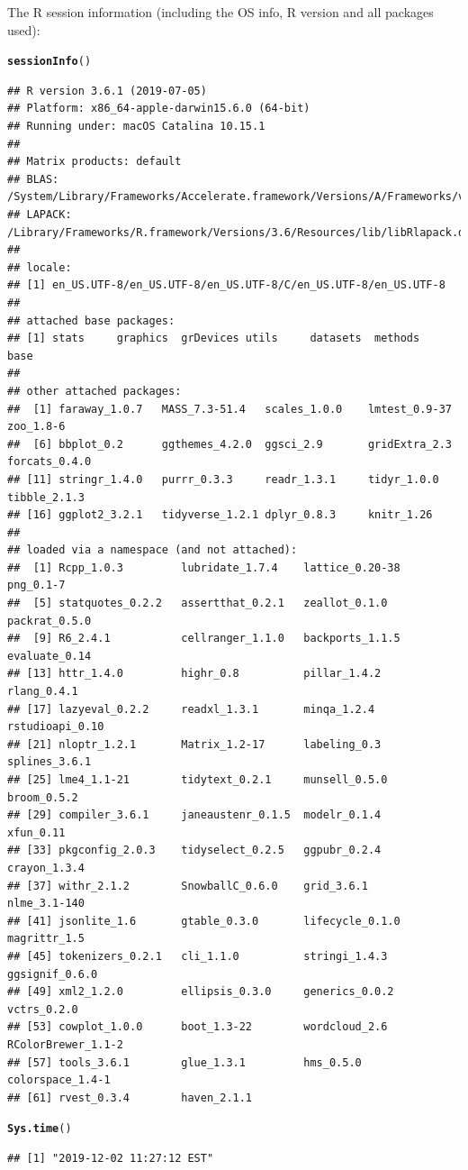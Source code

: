 \documentclass{article}\usepackage[]{graphicx}\usepackage[]{color}
\makeatletter
\newcommand{\hlstd}[1]{\textcolor[rgb]{0.345,0.345,0.345}{#1}}%
\newcommand{\hlkwd}[1]{\textcolor[rgb]{0.737,0.353,0.396}{\textbf{#1}}}%
\newenvironment{kframe}{%
 \def\at@end@of@kframe{}%
 \ifinner\ifhmode%
  \def\at@end@of@kframe{\end{minipage}}%
  \begin{minipage}{\columnwidth}%
 \fi\fi%
 \def\FrameCommand##1{\hskip\@totalleftmargin \hskip-\fboxsep
 \colorbox{shadecolor}{##1}\hskip-\fboxsep
     \hskip-\linewidth \hskip-\@totalleftmargin \hskip\columnwidth}%
 \MakeFramed {\advance\hsize-\width
   \@totalleftmargin\z@ \linewidth\hsize
   \@setminipage}}%
 {\par\unskip\endMakeFramed%
 \at@end@of@kframe}
\newenvironment{knitrout}{}{} %
\makeatother
\begin{document}
The R session information (including the OS info, R version and all
packages used):

\begin{knitrout}
\color{fgcolor}\begin{kframe}
\begin{alltt}
\hlkwd{sessionInfo}\hlstd{()}
\end{alltt}
\begin{verbatim}
## R version 3.6.1 (2019-07-05)
## Platform: x86_64-apple-darwin15.6.0 (64-bit)
## Running under: macOS Catalina 10.15.1
## 
## Matrix products: default
## BLAS:   /System/Library/Frameworks/Accelerate.framework/Versions/A/Frameworks/vecLib.framework/Versions/A/libBLAS.dylib
## LAPACK: /Library/Frameworks/R.framework/Versions/3.6/Resources/lib/libRlapack.dylib
## 
## locale:
## [1] en_US.UTF-8/en_US.UTF-8/en_US.UTF-8/C/en_US.UTF-8/en_US.UTF-8
## 
## attached base packages:
## [1] stats     graphics  grDevices utils     datasets  methods   base     
## 
## other attached packages:
##  [1] faraway_1.0.7   MASS_7.3-51.4   scales_1.0.0    lmtest_0.9-37   zoo_1.8-6      
##  [6] bbplot_0.2      ggthemes_4.2.0  ggsci_2.9       gridExtra_2.3   forcats_0.4.0  
## [11] stringr_1.4.0   purrr_0.3.3     readr_1.3.1     tidyr_1.0.0     tibble_2.1.3   
## [16] ggplot2_3.2.1   tidyverse_1.2.1 dplyr_0.8.3     knitr_1.26     
## 
## loaded via a namespace (and not attached):
##  [1] Rcpp_1.0.3         lubridate_1.7.4    lattice_0.20-38    png_0.1-7         
##  [5] statquotes_0.2.2   assertthat_0.2.1   zeallot_0.1.0      packrat_0.5.0     
##  [9] R6_2.4.1           cellranger_1.1.0   backports_1.1.5    evaluate_0.14     
## [13] httr_1.4.0         highr_0.8          pillar_1.4.2       rlang_0.4.1       
## [17] lazyeval_0.2.2     readxl_1.3.1       minqa_1.2.4        rstudioapi_0.10   
## [21] nloptr_1.2.1       Matrix_1.2-17      labeling_0.3       splines_3.6.1     
## [25] lme4_1.1-21        tidytext_0.2.1     munsell_0.5.0      broom_0.5.2       
## [29] compiler_3.6.1     janeaustenr_0.1.5  modelr_0.1.4       xfun_0.11         
## [33] pkgconfig_2.0.3    tidyselect_0.2.5   ggpubr_0.2.4       crayon_1.3.4      
## [37] withr_2.1.2        SnowballC_0.6.0    grid_3.6.1         nlme_3.1-140      
## [41] jsonlite_1.6       gtable_0.3.0       lifecycle_0.1.0    magrittr_1.5      
## [45] tokenizers_0.2.1   cli_1.1.0          stringi_1.4.3      ggsignif_0.6.0    
## [49] xml2_1.2.0         ellipsis_0.3.0     generics_0.0.2     vctrs_0.2.0       
## [53] cowplot_1.0.0      boot_1.3-22        wordcloud_2.6      RColorBrewer_1.1-2
## [57] tools_3.6.1        glue_1.3.1         hms_0.5.0          colorspace_1.4-1  
## [61] rvest_0.3.4        haven_2.1.1
\end{verbatim}
\begin{alltt}
\hlkwd{Sys.time}\hlstd{()}
\end{alltt}
\begin{verbatim}
## [1] "2019-12-02 11:27:12 EST"
\end{verbatim}
\end{kframe}
\end{knitrout}
\end{document}
